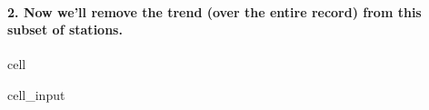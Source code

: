 \documentclass[letterpaper,10pt,english]{jupyterBook}
\begin{document}
\paragraph{2. Now we’ll remove the trend (over the entire record) from this subset of stations.}
\label{\detokenize{notebooks/regional_and_local/SL_anomaly_annual:now-we-ll-remove-the-trend-over-the-entire-record-from-this-subset-of-stations}}
\begin{sphinxuseclass}{cell}\begin{sphinxVerbatimInput}

\begin{sphinxuseclass}{cell_input}
\begin{sphinxVerbatim}[commandchars=\\\{\}]
    \PYG{p}{[}\PYG{p}{]}

\PYG{p}{[}\PYG{p}{]}  \PYG{p}{[}\PYG{p}{]}  
\end{sphinxVerbatim}

\end{sphinxuseclass}\end{sphinxVerbatimInput}

\end{sphinxuseclass}
\end{document}
